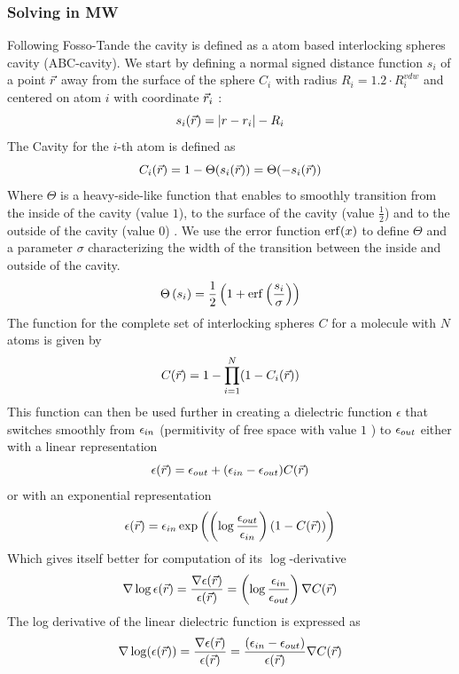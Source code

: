 \documentclass[../master_thesis.tex]{subfiles}
\begin{document}
\subsubsection{Solving in \ac{MW}}\label{solmw}
Following Fosso-Tande \cite{FossoTande:2013ka} the cavity is defined as a atom
based interlocking spheres cavity (ABC-cavity). We start by defining a normal
signed distance function $s_i$ of a point $\vec{r}$ away from the surface of the
sphere $C_i$ with radius $R_i = 1.2\cdot R^{vdw}_i$ and centered on atom $i$ with
coordinate $\vec{r}_i$ \cite{FossoTande:2013ka}:
\begin{equation}
  s_i(\vec{r}) = \abs{r -r_i} - R_i
\end{equation}
The Cavity for the $i$-th atom is defined as
\begin{equation}
  C_i(\vec{r}) = 1 - \Theta(s_i(\vec{r})) =\Theta(-s_i(\vec{r}))
\end{equation}
Where $\Theta$ is a heavy-side-like function that enables to smoothly transition
from the inside of the cavity (value $1$), to the surface of the cavity (value
$\frac{1}{2}$) and to the outside of the cavity (value $0$)
\cite{Sorland, FossoTande:2013ka}. We use the error function $\erf(x)$ to define
$\Theta$ and a parameter $\sigma$ characterizing the width of the transition
between the inside and outside of the cavity.
\begin{equation}
  \Theta\left(s_i\right) = \frac{1}{2}\left(1 + \erf\left(\frac{s_i}
  {\sigma}\right)\right)
\end{equation}
The function for the complete set of interlocking spheres $C$ for a molecule
with $N$ atoms is given by
\begin{equation}
  C(\vec{r}) = 1 - \prod_{i=1}^N(1 - C_i(\vec{r}))
\end{equation}
This function can then be used further in creating a dielectric function
$\epsilon$ that switches smoothly from $\epsilon_{in}$ (permitivity of free space
with value $1$ \cite{FossoTande:2013ka}) to $\epsilon_{out}$ either with a linear
representation
\begin{equation}\label{eq:dielfuncexp}
  \epsilon(\vec{r}) = \epsilon_{out}  + (\epsilon_{in} - \epsilon_{out})C(\vec{r})
\end{equation}
or with an exponential representation
\begin{equation}\label{eq:dielfunclin}
  \epsilon(\vec{r}) =\epsilon_{in}\exp\left( \left(\log\frac{\epsilon_{out}}{\epsilon_{in}} \right)
  (1 - C(\vec{r})) \right)
\end{equation}
Which gives itself better for computation of its $\log$-derivative
\cite{FossoTande:2013ka}
\begin{equation}\label{eq:logderepsexp}
  \nabla\log\epsilon(\vec{r}) = \frac{\nabla\epsilon(\vec{r})}{\epsilon(\vec{r})}
   = \left(\log\frac{\epsilon_{in}}{\epsilon_{out}} \right)\nabla C(\vec{r})
\end{equation}
The log derivative of the linear dielectric function is expressed as
\begin{equation}\label{eq:logderepslin}
  \nabla \log(\epsilon (\vec{r})) = \frac{\nabla\epsilon(\vec{r})}{\epsilon(\vec{r})}
  = \frac{(\epsilon_{in} - \epsilon_{out})}{\epsilon(\vec{r})}\nabla C(\vec{r})
\end{equation}
\end{document}
